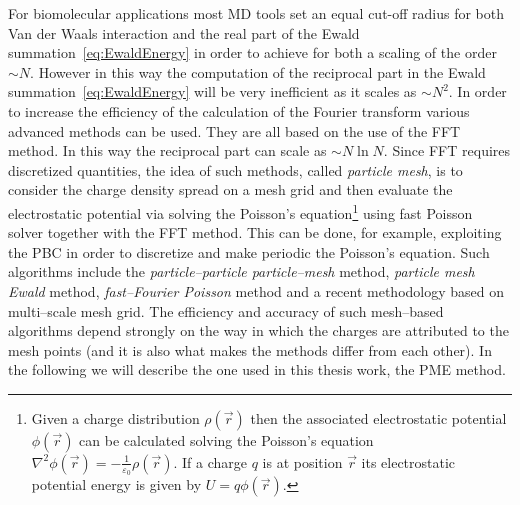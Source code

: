 For biomolecular applications most \ac{MD} tools set an equal cut-off radius for both Van der Waals interaction
and the real part of the Ewald summation~\eqref{eq:EwaldEnergy} in order to achieve for both a scaling of the
order $\sim N$. However in this way the computation of the reciprocal part in the Ewald
summation~\eqref{eq:EwaldEnergy} will be very inefficient as it scales as $\sim N^2$. In order to increase the
efficiency of the calculation of the Fourier transform various advanced methods can be used. They are all based
on the use of the \ac{FFT} method. In this way the reciprocal part can scale as $\sim N\ln N$. Since \ac{FFT}
requires discretized quantities, the idea of such methods, called \textit{particle mesh}, is to consider the
charge density spread on a mesh grid and then evaluate the electrostatic potential via solving the Poisson's
equation\footnote{Given a charge distribution $\rho(\vec r)$ then the associated electrostatic potential
$\phi(\vec r)$ can be calculated solving the Poisson's equation 
$\displaystyle \nabla^2\phi(\vec r) = -\frac{1}{\varepsilon_0} \rho(\vec r)$. If a charge $q$ is at position 
$\vec r$ its electrostatic potential energy is given by $U = q\phi(\vec r)$.}
using fast Poisson solver together with the \ac{FFT} method. This can be done, for example, exploiting the
\ac{PBC} in order to discretize and make periodic the Poisson's equation. Such algorithms include the 
\textit{particle--particle particle--mesh} method, \textit{particle mesh Ewald} method, 
\textit{fast--Fourier Poisson} method and a recent methodology based on multi--scale mesh grid. The efficiency 
and accuracy of such mesh--based algorithms depend strongly on the way in which the charges are attributed to 
the mesh points (and it is also what makes the methods differ from each other). In the following we will 
describe the one used in this thesis work, the \acf{PME} method.

